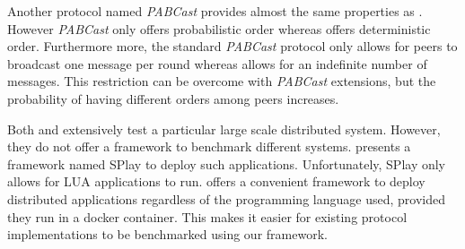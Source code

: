 Another protocol named \textit{PABCast} \autocite{felber2002} provides almost the same properties as \epto. However \textit{PABCast} only offers probabilistic order whereas \epto offers deterministic order. Furthermore more, the standard \textit{PABCast} protocol only allows for peers to broadcast one message per round whereas \epto allows for an indefinite number of messages. This restriction can be overcome with \textit{PABCast} extensions, but the probability of having different orders among peers increases.

Both \autocite{Chandra2007} and \autocite{Maia2011} extensively test a particular large scale distributed system. However, they do not offer a framework to benchmark different systems. \autocite{Leonini2009} presents a framework named SPlay to deploy such applications. Unfortunately, SPlay only allows for LUA applications to run. \eptotester offers a convenient framework to deploy distributed applications regardless of the programming language used, provided they run in a docker container. This makes it easier for existing protocol implementations to be benchmarked using our framework.
